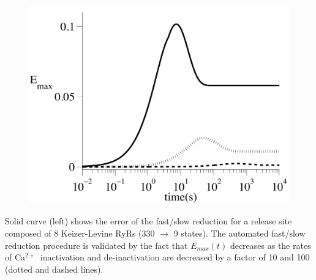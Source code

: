 \documentclass[a0]{a0poster}
\def\Ca{Ca$^{2+}$}
\begin{document}
\begin{textblock}{7.5}
\begin{figure}
\vspace{-0.3in}
\includegraphics*[width=8in]{pics/valid_p}
\label{validation}
\end{figure}

Solid curve (left) shows the error of the fast/slow reduction for a release site composed of 8 Keizer-Levine RyRs (330 $\rightarrow$ 9 states). The automated fast/slow reduction procedure is validated by the fact that $E_{max}(t)$ decreases as the rates of \Ca\ inactivation and de-inactivation are decreased by a factor of 10 and 100 (dotted and dashed lines).
\end{textblock}
\end{document}
